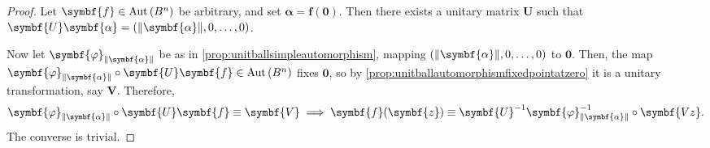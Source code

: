 \begin{proof}
    Let \(\symbf{f}\in\Aut\qty(B^n)\) be arbitrary, and set \(\symbf{\alpha}=\symbf{f}(\symbf{0})\). Then there exists a unitary matrix \(\symbf{U}\) such that \(\symbf{U}\symbf{\alpha}=\qty(\norm{\symbf{\alpha}},0,\ldots,0)\).

    Now let \(\symbf{\varphi}_{\norm{\symbf{\alpha}}}\) be as in \cref{prop:unitballsimpleautomorphism}, mapping \(\qty(\norm{\symbf{\alpha}},0,\ldots,0)\) to \(\symbf{0}\). Then, the map \(\symbf{\varphi}_{\norm{\symbf{\alpha}}}\circ\symbf{U}\symbf{f}\in\Aut\qty(B^n)\) fixes \(\symbf{0}\), so by \cref{prop:unitballautomorphismfixedpointatzero} it is a unitary transformation, say \(\symbf{V}\). Therefore, \[\symbf{\varphi}_{\norm{\symbf{\alpha}}}\circ\symbf{U}\symbf{f}\equiv\symbf{V}\implies\symbf{f}(\symbf{z})\equiv\symbf{U}^{-1}\symbf{\varphi}_{\norm{\symbf{\alpha}}}^{-1}\circ\symbf{Vz}.\] The converse is trivial.
\end{proof}